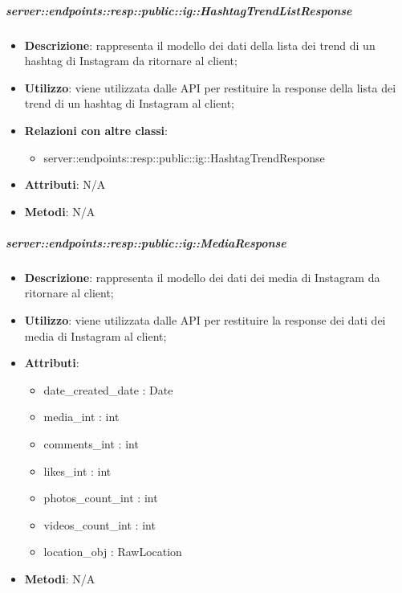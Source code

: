     \subparagraph{server::endpoints::resp::public::ig::HashtagTrendListResponse} %
    \label{subp:bdsm_app_server_endpoints_resp_public_ig_hashtagtrendlistresponse}
    \begin{itemize}
      \item \textbf{Descrizione}: rappresenta il modello dei dati della lista dei trend di un hashtag di Instagram da ritornare al client;
      \item \textbf{Utilizzo}: viene utilizzata dalle API per restituire la response della lista dei trend di un hashtag di Instagram al client;
      \item \textbf{Relazioni con altre classi}:
        \begin{itemize}
          \item server::endpoints::resp::public::ig::HashtagTrendResponse
        \end{itemize}
	  \item \textbf{Attributi}: N/A
	  \item \textbf{Metodi}: N/A
      \end{itemize}

    \subparagraph{server::endpoints::resp::public::ig::MediaResponse} %
    \label{subp:bdsm_app_server_endpoints_resp_public_ig_mediaresponse}
    \begin{itemize}
      \item \textbf{Descrizione}: rappresenta il modello dei dati dei media di Instagram da ritornare al client;
      \item \textbf{Utilizzo}: viene utilizzata dalle API per restituire la response dei dati dei media di Instagram al client;
      
	  \item \textbf{Attributi}:  
	  	\begin{itemize}
	  		\item date\_created\_date : Date
	  		\item media\_int : int
	  		\item comments\_int : int
	  		\item likes\_int : int
	  		\item photos\_count\_int : int
	  		\item videos\_count\_int : int
	  		\item location\_obj : RawLocation
	  	\end{itemize}
	  \item \textbf{Metodi}: N/A
      \end{itemize}

